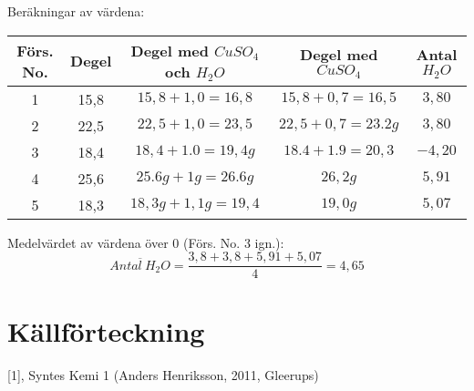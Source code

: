 \documentclass{article}
\begin{document}
	
	\begin{center}
			Beräkningar av värdena:
		\begin{tabular}{||c c c c c||} 
			\hline
			Förs. No. & Degel & Degel med $CuSO_4$ och $H_2O$ & Degel med $CuSO_4$  & Antal $H_2O$ \\ [0.5ex] 
			\hline\hline
			1 & 15,8 & $15,8+1,0=16,8$ & $15,8+0,7=16,5$ & $3,80$ \\ 
			\hline
			2 & 22,5 & $22,5+1,0=23,5$ & $22,5+0,7=23.2g$ & $3,80$\\
			\hline
			3 & 18,4 & $18,4+1.0=19,4g$  & $18.4+1.9=20,3$ & $-4,20$\\
			\hline
			4 & 25,6 & $25.6g+1g=26.6g$ & $26,2g$ & $5,91$ \\
			\hline
			5 & 18,3 & $18,3g+1,1 g=19,4$  & $19,0g$ & $5,07$ \\ [1ex] 
			\hline
		\end{tabular}
	\end{center}
	\newcommand*\mean[1]{\bar{#1}}
	Medelvärdet av värdena över 0 (Förs. No. 3 ign.):
	\[\overline{Antal\:H_2O}=\frac{3,8+3,8+5,91+5,07}{4}=4,65\]
	\pagebreak
	
	
	\section{Källförteckning}
	[1], Syntes Kemi 1 (Anders Henriksson, 2011, Gleerups) 
	\newline[ISBN: 978-91-40-67418-0]
	\newline
	
	
	
\end{document}
